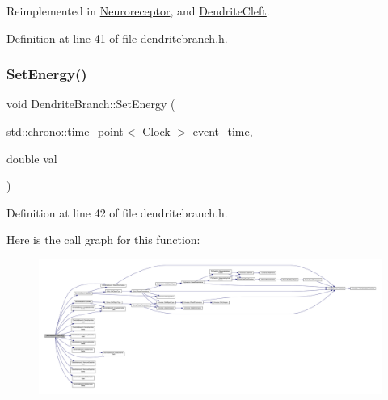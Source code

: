 Reimplemented in \hyperlink{class_neuroreceptor_a0660a316ef44cf723509f720acd16f24}{Neuroreceptor}, and \hyperlink{class_dendrite_cleft_a428b8e5117f381a382e0071b936d42a1}{Dendrite\+Cleft}.



Definition at line 41 of file dendritebranch.\+h.

\mbox{\label{class_dendrite_branch_a13dd0373022d653448c9067d075586a8}} 
\subsubsection{\texorpdfstring{Set\+Energy()}{SetEnergy()}}
{\footnotesize\ttfamily void Dendrite\+Branch\+::\+Set\+Energy (\begin{DoxyParamCaption}\item[{std\+::chrono\+::time\+\_\+point$<$ \hyperlink{universe_8h_a0ef8d951d1ca5ab3cfaf7ab4c7a6fd80}{Clock} $>$}]{event\+\_\+time,  }\item[{double}]{val }\end{DoxyParamCaption})\hspace{0.3cm}{\ttfamily [inline]}}



Definition at line 42 of file dendritebranch.\+h.

Here is the call graph for this function\+:
\nopagebreak
\begin{figure}[H]
\begin{center}
\leavevmode
\includegraphics[width=350pt]{class_dendrite_branch_a13dd0373022d653448c9067d075586a8_cgraph}
\end{center}
\end{figure}
\mbox{\label{class_dendrite_branch_a8540dfafeb5bd45f782ab31b8231b10f}} 
